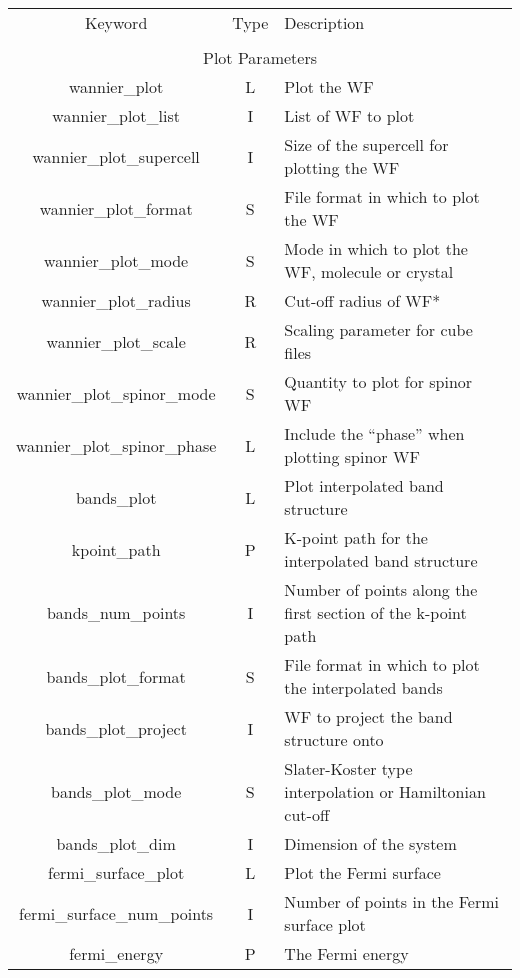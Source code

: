 \begin{longtable}{|c|c|p{6cm}|}
  \hline
  Keyword & Type & Description \\
  &      &             \\
  \hline\hline
  \multicolumn{3}{|c|}{Plot Parameters} \\
  \hline
  {\sc wannier\_plot }   & L & Plot the WF \\
  {\sc wannier\_plot\_list } & I & List of WF to plot \\
  {\sc wannier\_plot\_supercell }   & I & Size of the supercell for
  plotting the WF \\
  {\sc wannier\_plot\_format }   & S & File format in which to plot the
  WF \\
  {\sc wannier\_plot\_mode }   & S & Mode in which to plot the
  WF, molecule or crystal \\
  {\sc wannier\_plot\_radius } & R & Cut-off radius of WF* \\
  {\sc wannier\_plot\_scale } & R & Scaling parameter for cube files \\
  {\sc wannier\_plot\_spinor\_mode } & S& Quantity to plot for spinor WF\\
  {\sc wannier\_plot\_spinor\_phase } & L& Include the ``phase'' when plotting spinor WF\\
  {\sc bands\_plot }   & L & Plot interpolated band structure \\
  {\sc kpoint\_path }   & P & K-point path for the interpolated band structure  \\
  {\sc bands\_num\_points }   & I & Number of points along the first
  section of the k-point path \\
  {\sc bands\_plot\_format }   & S & File format in which to plot the
  interpolated bands \\
  {\sc bands\_plot\_project } & I & WF to project the band structure onto \\
  {\sc bands\_plot\_mode }   & S & Slater-Koster type interpolation or
  Hamiltonian cut-off \\
  {\sc bands\_plot\_dim } & I & Dimension of the system \\
  {\sc fermi\_surface\_plot }   & L & Plot the Fermi surface \\
  {\sc fermi\_surface\_num\_points }   & I & Number of points in the Fermi
  surface plot\\
  {\sc fermi\_energy }   & P & The Fermi energy \\

\end{longtable}
